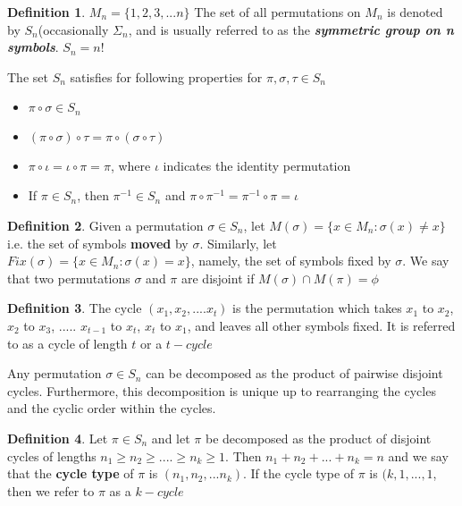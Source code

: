 \documentclass{article}
\theoremstyle{definition}
\newtheorem*{defi}{Definition}
\theoremstyle{definition}
\newenvironment{manualprop}[1]{%
  \renewcommand\themanualpropinner{#1}%
  \manualpropinner
}{\endmanualpropinner}
\theoremstyle{named}
\begin{document}
\begin{defi}
$M_n = \{1, 2, 3, ...n\}$
The set of all permutations on $M_n$ is denoted by $S_n$(occasionally $\Sigma_n$, and is usually referred to as the \textbf{\textit{symmetric group on n symbols}}. $S_n = n!$
\end{defi}

\begin{manualprop}{17}
The set $S_n$ satisfies for following properties for $\pi, \sigma, \tau \in S_n$
\begin{itemize}
    \item $\pi \circ \sigma \in S_n$
    \item $(\pi \circ \sigma) \circ \tau = \pi \circ (\sigma \circ \tau)$
    \item $\pi \circ \iota = \iota \circ \pi = \pi$, where $\iota$ indicates the identity permutation 
    \item If $\pi \in S_n$, then $\pi^{-1} \in S_n$ and $\pi \circ \pi^{-1} = \pi^{-1} \circ \pi = \iota$
\end{itemize}
\end{manualprop}

\begin{defi}
Given a permutation $\sigma \in S_n$, let $M(\sigma) = \{x \in M_n: \sigma(x) \neq x\}$ i.e. the set of symbols \textbf{moved} by $\sigma$.
Similarly, let $Fix(\sigma) = \{x \in M_n: \sigma(x) = x\}$, namely, the set of symbols fixed by $\sigma$. We say that two permutations $\sigma$ and $\pi$ are disjoint if $M(\sigma) \cap M(\pi) = \phi$ 
\end{defi}

\begin{defi}
The cycle $(x_1, x_2, .... x_t)$ is the permutation which takes $x_1$ to $x_2$, $x_2$ to $x_3$, ..... $x_{t-1}$ to $x_t$, $x_t$ to $x_1$, and leaves all other symbols fixed. It is referred to as a  cycle of length $t$ or a $t-cycle$  
\end{defi}

\begin{manualprop}{18}
Any permutation $\sigma \in S_n$ can be decomposed as the product of pairwise disjoint cycles. Furthermore, this decomposition is unique up to rearranging the cycles and the cyclic order within the cycles. 
\end{manualprop}

\begin{defi}
Let $\pi \in S_n$ and let $\pi$ be decomposed as the product of disjoint cycles of lengths $n_1 \geq n_2 \geq .... \geq n_k \geq 1$. Then $n_1 + n_2 + ... + n_k = n$ and we say that the \textbf{cycle type} of $\pi$ is $(n_1, n_2, ...n_k)$. If the cycle type of $\pi$ is $(k, 1, ..., 1$, then we refer to $\pi$  as a $k-cycle$
\end{defi}
\end{document}
